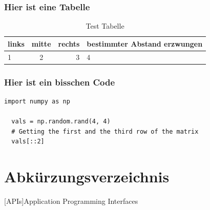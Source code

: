 \documentclass[a4paper,
    11pt,
    headings=small,
    ngerman,
    listof=totoc,
    index=totoc,
    numbers=noenddot]{scrreprt}[2021/11/13]
\begin{document}
\subsection{Hier ist eine Tabelle}

\begin{table}[h]
  \centering
  \renewcommand{\arraystretch}{1.25}
  \caption{Test Tabelle}
  \begin{tabular}{lcr|p{5cm}}
    links & mitte & rechts & bestimmter Abstand erzwungen \\
    \hline
    1     & 2     & 3      & 4                            \\
  \end{tabular}
  \label{tab:testtabelle}
\end{table}


\subsection{Hier ist ein bisschen Code}

\begin{lstlisting}[caption={Spalten in numpy}, style=MyPythonStyle]
  import numpy as np

  vals = np.random.rand(4, 4)
  # Getting the first and the third row of the matrix
  vals[::2]
\end{lstlisting}


\newpage
\printbibliography[keyword=Quelle,title={Quellenangabe},heading=bibintoc]

\newpage
\chapter*{Abkürzungsverzeichnis}
\begin{acronym}[HTML]
  [APIs]{Application Programming Interfaces}
\end{acronym}

\listoffigures
\listoftables
\lstlistoflistings


\newpage
\pagestyle{scrheadings}
\appendix
\listofatocs
\newpage
\end{document}
